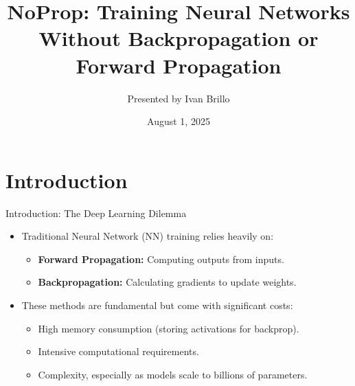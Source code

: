 \documentclass{beamer}
\title{NoProp: Training Neural Networks Without Backpropagation or Forward Propagation}
\author{Presented by Ivan Brillo}
\date{August 1, 2025}
\begin{document}
\frame{\titlepage}

\section{Introduction}

\begin{frame}{Introduction: The Deep Learning Dilemma}
    \begin{itemize}
        \item Traditional Neural Network (NN) training relies heavily on:
        \begin{itemize}
            \item \textbf{Forward Propagation:} Computing outputs from inputs.
            \item \textbf{Backpropagation:} Calculating gradients to update weights.
        \end{itemize}
        \item These methods are fundamental but come with significant costs:
        \begin{itemize}
            \item High memory consumption (storing activations for backprop).
            \item Intensive computational requirements.
            \item Complexity, especially as models scale to billions of parameters.
        \end{itemize}
    \end{itemize}
\end{frame}
\end{document}

